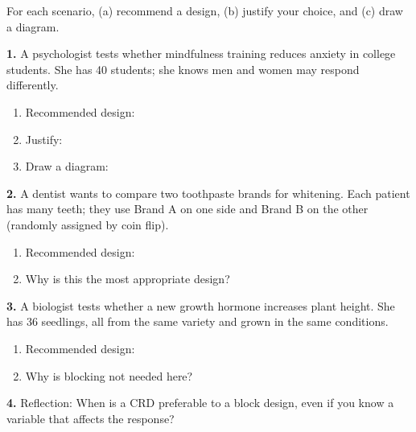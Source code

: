 \documentclass[10pt]{article}
\begin{document}
\namedateperiod

\vspace{0.1in}

\begin{practicebox}
\small
For each scenario, (a) recommend a design, (b) justify your choice, and
(c) draw a diagram.

\vspace{8pt}
\textbf{1.} A psychologist tests whether mindfulness training reduces anxiety in college
students. She has 40 students; she knows men and women may respond differently.

\begin{enumerate}[label=(\alph*), leftmargin=2em, itemsep=8pt]
  \item Recommended design: \blank{7cm}
  \item Justify: \writeline\\[1pt]\writeline
  \item Draw a diagram:
  \vspace{1.3in}
\end{enumerate}

\vspace{8pt}
\textbf{2.} A dentist wants to compare two toothpaste brands for whitening. Each
patient has many teeth; they use Brand A on one side and Brand B on the other (randomly
assigned by coin flip).

\begin{enumerate}[label=(\alph*), leftmargin=2em, itemsep=8pt]
  \item Recommended design: \blank{7cm}
  \item Why is this the most appropriate design? \writeline\\[1pt]\writeline
\end{enumerate}

\vspace{8pt}
\textbf{3.} A biologist tests whether a new growth hormone increases plant height. She
has 36 seedlings, all from the same variety and grown in the same conditions.

\begin{enumerate}[label=(\alph*), leftmargin=2em, itemsep=8pt]
  \item Recommended design: \blank{7cm}
  \item Why is blocking not needed here? \writeline\\[1pt]\writeline
\end{enumerate}

\vspace{8pt}
\textbf{4.} Reflection: When is a CRD preferable to a block design, even if you know
a variable that affects the response?\\[4pt]
\writeline\\[1pt]\writeline\\[1pt]\writeline
\end{practicebox}
\end{document}
